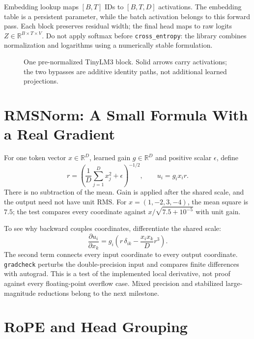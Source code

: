 Embedding lookup maps \([B,T]\) IDs to \([B,T,D]\) activations. The embedding
table is a persistent parameter, while the batch activation belongs to this
forward pass. Each block preserves residual width; the final head maps to raw
logits \(Z\in\mathbb{R}^{B\times T\times V}\). Do not apply softmax before
\texttt{cross\_entropy}: the library combines normalization and logarithms
using a numerically stable formulation.

\begin{figure}[htbp]\centering

\caption{One pre-normalized TinyLM3 block. Solid arrows carry activations;
the two bypasses are additive identity paths, not additional learned projections.}
\label{fig:modern-block}
\end{figure}

\section{RMSNorm: A Small Formula With a Real Gradient}

For one token vector \(x\in\mathbb{R}^{D}\), learned gain
\(g\in\mathbb{R}^{D}\) and positive scalar \(\epsilon\), define
\[
 r=\left(\frac{1}{D}\sum_{j=1}^{D}x_j^2+\epsilon\right)^{-1/2},
 \qquad u_i=g_i x_i r.
\]
There is no subtraction of the mean. Gain is applied after the shared scale,
and the output need not have unit RMS. For \(x=(1,-2,3,-4)\), the mean square
is \(7.5\); the test compares every coordinate against
\(x/\sqrt{7.5+10^{-5}}\) with unit gain.

To see why backward couples coordinates, differentiate the shared scale:
\[
 \frac{\partial u_i}{\partial x_k}
 =g_i\left(r\,\delta_{ik}-\frac{x_i x_k}{D}r^3\right).
\]
The second term connects every input coordinate to every output coordinate.
\texttt{gradcheck} perturbs the double-precision input and compares finite
differences with autograd. This is a test of the implemented local derivative,
not proof against every floating-point overflow case. Mixed precision and
stabilized large-magnitude reductions belong to the next milestone.

\section{RoPE and Head Grouping}

